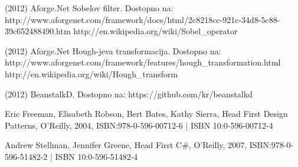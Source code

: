 \documentclass[oneside, a4paper, 12pt]{book}
\begin{document}
\begin{thebibliography}{99}
 (2012) Aforge.Net Sobelov filter. Dostopno na:\\ 
http://www.aforgenet.com/framework/docs/html/2c8218cc-921c-34d8-5c88-39c652488490.htm 
http://en.wikipedia.org/wiki/Sobel\_operator

 (2012) Aforge.Net Hough-jeva transformacija. Dostopno na: 
http://www.aforgenet.com/framework/features/hough\_transformation.html 
http://en.wikipedia.org/wiki/Hough\_transform 

 (2012) BeanstalkD. Dostopno na:  
https://github.com/kr/beanstalkd 

 Eric Freeman, Elisabeth Robson, Bert Bates, Kathy Sierra, Head First Design Patterns, O'Reilly, 2004, ISBN:978-0-596-00712-6 | ISBN 10:0-596-00712-4

 Andrew Stellman, Jennifer Greene, Head First C\#, O'Reilly, 2007, ISBN:978-0-596-51482-2 | ISBN 10:0-596-51482-4

\end{thebibliography}
\end{document}
